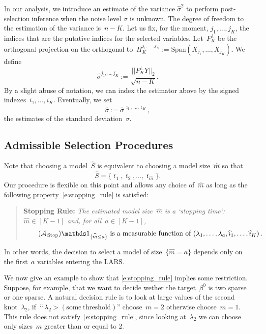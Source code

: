 \documentclass[final,numbib]{imaiai}%
\numberwithin{equation}{section}
\def\eq{\begin{equation}}
\def\qe{\end{equation}}
\renewcommand{\bar}{\overline}
\renewcommand{\hat}{\widehat}
\newcommand{\<}{\langle}
\renewcommand{\>}{\rangle}
\newcommand{\1}{\mathds{1}}
\begin{document}
{ In our analysis, we introduce an estimate of the variance $  \hat \sigma^2$ to perform post-selection inference when the noise level $\sigma$ is unknown. The degree of freedom to the estimation of  the variance is~$n-K$. Let us fix, for the moment, $ j_1,\ldots, j_{K}$,   the indices that are  the putative indices for the  selected variables. Let~$P^\perp_{K}$ be the orthogonal projection on the orthogonal to~$H_K^{j_1,\ldots, j_{K}}:=\mathrm{Span}(X_{j_1}, \ldots, X_{ j_{K}})$. We define   
 \eq
      \label{e:def_sigmas}
     \hat \sigma^{j_1,\ldots, j_{K}}  := \frac{ ||P^\perp_{K} Y||_2 }{\sqrt{n-K}} .
    \qe
   By a slight abuse of notation, we can index the estimator above by the signed indexes~$i_1, \ldots, i_{K}$.
%
Eventually, we set 
\[
    \hat \sigma  := \hat \sigma^{\,\bar \imath_1,\ldots, \bar \imath_{K}},
\]
 the estimates of the standard deviation~$\sigma$.
 
 \subsection{Admissible Selection Procedures} \label{s:ap}\label{sec:exact_test_admissible}
 
 Note that choosing a model~$\hat S$ is equivalent to choosing a model size~$\hat m$ so that~
\eq
\label{e:selection_procedure}
\hat S =\big \{\bar  \imath_1,\bar  \imath_2,\ldots,\bar \imath_{\hat m}\big\}.
\qe
Our procedure is flexible on this point and allows any choice of~$\hat m$ as long as the following property~\eqref{e:stopping_rule} is satisfied:
\begin{quote}
{\normalsize
{\bf Stopping Rule:}
\it 
The estimated model size~$\hat m$ is a ‘{stopping time}':~$\hat m\in[K-1]$ and, for all~$a\in[K-1]$,
\eq
\tag{$\bf\mathcal A_{\mathrm{\,Stop}}$}
\label{e:stopping_rule}
\mathds 1_{\{\hat m\leq a\}}\text{~is a measurable function of~}(\lambda_1, \ldots, \lambda_a, \hat \imath_1,\ldots, \hat \imath_{K})\,.
\qe
}
\end{quote}

\noindent
In other words, the decision to select a model of size~$\{\hat m=a\}$ depends only on the first~$a$ variables entering the LARS.

\begin{remark}
We now give an example to show that {\eqref{e:stopping_rule}} implies some restriction.
Suppose, for example, that we want to decide wether the target~$\beta^0$ is two sparse or one sparse.
A natural decision rule is to look at large values of the second knot~$\lambda_2$, if~$\text{‘‘}\,\lambda_2 > \mathrm{(some\ threshold)}\text{''}$   choose~$ m=2$  otherwise choose~$m=1$.
  This rule does not satisfy~\eqref{e:stopping_rule}, since looking at~$\lambda_2$  we can choose only sizes~$m$ greater than or equal to 2.
\end{remark}

}
\end{document}
